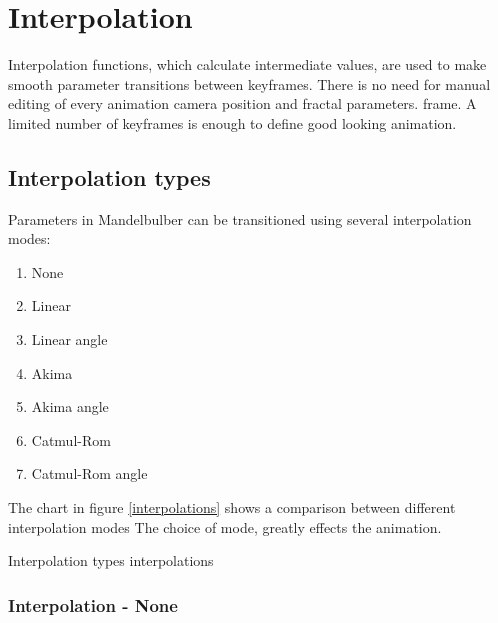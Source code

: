 \section{Interpolation}\label{interpolation}

Interpolation functions, which calculate intermediate values, are used to make smooth parameter transitions between keyframes. There is no need for manual editing of every animation camera position and fractal parameters. 
frame. A limited number of keyframes is enough to define good looking animation.

\subsection{Interpolation types}\label{interpolation-types}

Parameters in Mandelbulber can be transitioned using several interpolation modes:

\begin{multicols}{3}
\begin{enumerate}
	
	\item None

	\item Linear

	\item Linear angle
	
	\item Akima	

	\item Akima angle
	
	\item Catmul-Rom

	\item Catmul-Rom angle
	
\end{enumerate}
\end{multicols}

The chart in figure \ref{interpolations} shows a comparison between different interpolation modes
The choice of mode, greatly effects the animation.

{Interpolation types}
{interpolations}

\subsubsection{Interpolation - None}\label{interpolation-none}

